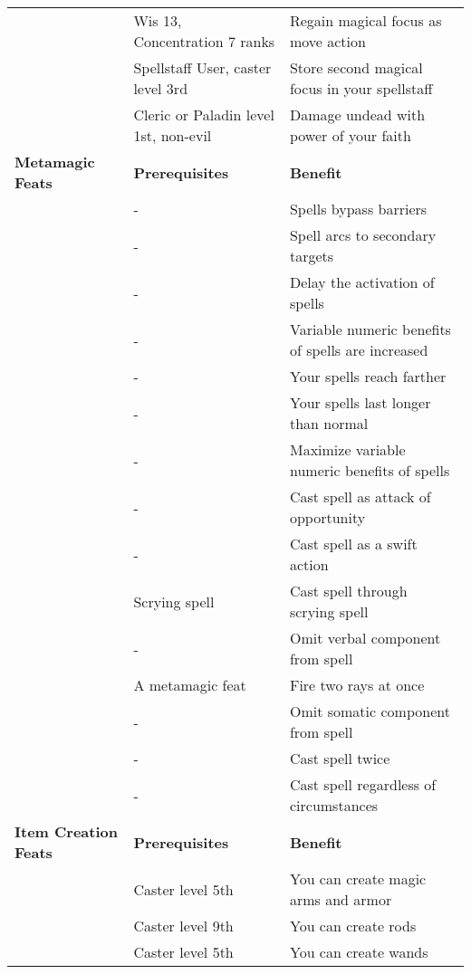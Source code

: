 \begin{table*}
{{\begin{tabular}{|p{}|p{}|p{}|}
\nameref{Feat:RapidRefocusing}&Wis 13, Concentration 7 ranks&Regain magical focus as move action\\
\nameref{Feat:SpellstaffContainment}&Spellstaff User, caster level 3rd&Store second magical focus in your spellstaff\\
\nameref{Feat:TurnUndead}&Cleric or Paladin level 1st, non-evil&Damage undead with power of your faith\\
\hline
\textbf{Metamagic Feats}&\textbf{Prerequisites}&\textbf{Benefit}\\
\hline
\nameref{Feat:BurrowingSpell}&-&Spells bypass barriers\\
\nameref{Feat:ChainSpell}&-&Spell arcs to secondary targets\\
\nameref{Feat:DelaySpell}&-&Delay the activation of spells\\
\nameref{Feat:EmpowerSpell}&-&Variable numeric benefits of spells are increased\\
\nameref{Feat:EnlargeSpell}&-&Your spells reach farther\\
\nameref{Feat:ExtendSpell}&-&Your spells last longer than normal\\
\nameref{Feat:MaximizeSpell}&-&Maximize variable numeric benefits of spells\\
\nameref{Feat:OpportunitySpell}&-&Cast spell as attack of opportunity\\
\nameref{Feat:QuickenSpell}&-&Cast spell as a swift action\\
\nameref{Feat:ScryAndDie}&Scrying spell&Cast spell through scrying spell\\
\nameref{Feat:SilentSpell}&-&Omit verbal component from spell\\
\nameref{Feat:SplitRay}&A metamagic feat&Fire two rays at once\\
\nameref{Feat:StillSpell}&-&Omit somatic component from spell\\
\nameref{Feat:TwinSpell}&-&Cast spell twice\\
\nameref{Feat:UnconditionalSpell}&-&Cast spell regardless of circumstances\\
\hline
\textbf{Item Creation Feats}&\textbf{Prerequisites}&\textbf{Benefit}\\
\hline
\nameref{Feat:CraftMagicArmsAndArmor}&Caster level 5th&You can create magic arms and armor\\
\nameref{Feat:CraftRod}&Caster level 9th&You can create rods\\
\nameref{Feat:CraftWand}&Caster level 5th&You can create wands\\

\end{tabular}}}
\end{table*}
